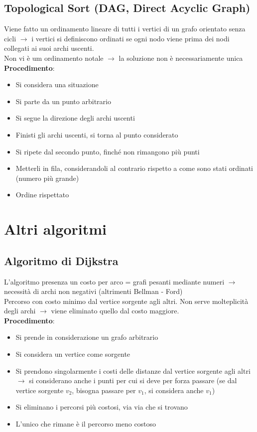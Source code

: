 \documentclass[12pt,a4paper]{article}
\begin{document}
\subsection{Topological Sort (DAG, Direct Acyclic Graph)}
Viene fatto un ordinamento lineare di tutti i vertici di un grafo orientato senza cicli $\rightarrow$ i vertici si definiscono ordinati se ogni nodo viene prima dei nodi collegati ai suoi archi uscenti.\\
Non vi è um ordinamento notale $\rightarrow$ la soluzione non è necessariamente unica\\
\textbf{Procedimento}:
\begin{itemize}
\item Si considera una situazione
\item Si parte da un punto arbitrario
\item Si segue la direzione degli archi uscenti
\item Finisti gli archi uscenti, si torna al punto considerato
\item Si ripete dal secondo punto, finché non rimangono più punti
\item Metterli in fila, considerandoli al contrario rispetto a come sono stati ordinati (numero più grande)
\item Ordine rispettato
\end{itemize}

\clearpage
\section{Altri algoritmi}
\subsection{Algoritmo di Dijkstra}
L'algoritmo presenza un costo per arco = grafi pesanti mediante numeri $\rightarrow$ necessità di archi non negativi (altrimenti Bellman - Ford)\\
Percorso con costo minimo dal vertice sorgente agli altri. Non serve molteplicità degli archi $\rightarrow$ viene eliminato quello dal costo maggiore.\\
\textbf{Procedimento}:
\begin{itemize}
\item Si prende in considerazione un grafo arbitrario
\item Si considera un vertice come sorgente
\item Si prendono singolarmente i costi delle distanze dal vertice sorgente agli altri $\rightarrow$ si considerano anche i punti per cui si deve per forza passare (se dal vertice sorgente $v_2$, bisogna passare per $v_1$, si considera anche $v_1$)
\item Si eliminano i percorsi più costosi, via via che si trovano
\item L'unico che rimane è il percorso meno costoso
\end{itemize}
\end{document}
